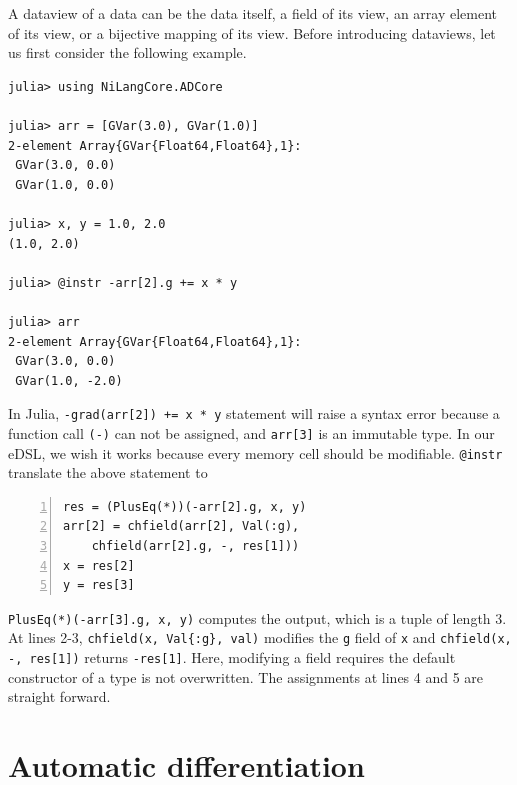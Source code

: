 \documentclass[aps,twocolumn,longbibliography,english,superscriptaddress]{revtex4-1}
\newcommand{\<}{\langle}
\renewcommand{\>}{\rangle}
\theoremstyle{definition}\newtheorem{definition}{\textit{Definition}}
\begin{document}
A dataview of a data can be the data itself, a field of its view, an array element of its view, or a bijective mapping of its view.
Before introducing dataviews, let us first consider the following example.

\begin{minipage}{.44\textwidth}
\begin{lstlisting}
julia> using NiLangCore.ADCore

julia> arr = [GVar(3.0), GVar(1.0)]
2-element Array{GVar{Float64,Float64},1}:
 GVar(3.0, 0.0)
 GVar(1.0, 0.0)

julia> x, y = 1.0, 2.0
(1.0, 2.0)

julia> @instr -arr[2].g += x * y

julia> arr
2-element Array{GVar{Float64,Float64},1}:
 GVar(3.0, 0.0)
 GVar(1.0, -2.0)
\end{lstlisting}
\end{minipage}

In Julia, \texttt{-grad(arr[2]) += x * y} statement will raise a syntax error because a function call \texttt{(-)} can not be assigned, and \texttt{arr[3]} is an immutable type.
In our eDSL, we wish it works because every memory cell should be modifiable.
\texttt{@instr} translate the above statement to

\begin{minipage}{.44\textwidth}
    \begin{lstlisting}[numberstyle=\scriptsize\color{gray},numbers=left,numbersep=8pt]
res = (PlusEq(*))(-arr[2].g, x, y)
arr[2] = chfield(arr[2], Val(:g),
    chfield(arr[2].g, -, res[1]))
x = res[2]
y = res[3]
\end{lstlisting}
\end{minipage}

\texttt{PlusEq(*)(-arr[3].g, x, y)} computes the output, which is a tuple of length $3$.
At lines 2-3, \texttt{chfield(x, Val\{:g\}, val)} modifies the \texttt{g} field of \texttt{x} and \texttt{chfield(x, -, res[1])} returns \texttt{-res[1]}. Here, modifying a field requires the default constructor of a type is not overwritten.
The assignments at lines 4 and 5 are straight forward.

\section{Automatic differentiation}\label{sec:bp}
\end{document}
